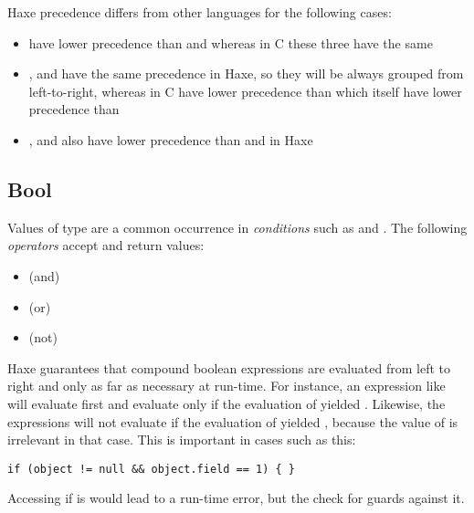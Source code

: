 Haxe precedence differs from other languages for the following cases:
\begin{itemize}
	\item \expr{\%} have lower precedence than \expr{*} and \expr{/} whereas in C these three have the same
	\item \expr{|}, \expr{\&} and \expr{\^} have the same precedence in Haxe, so they will be always grouped from left-to-right, whereas in C \expr{\&} have lower precedence than \expr{\^} which itself have lower precedence than \expr{|}
	\item \expr{|}, \expr{\&} and \expr{\^} also have lower precedence than \expr{==} and \expr{!=} in Haxe
\end{itemize}

\subsection{Bool}
\label{types-bool}


Values of type  are a common occurrence in \emph{conditions} such as  and . The following \emph{operators} accept and return  values:

\begin{itemize}
	\item \expr{\&\&} (and)
	\item \expr{||} (or)
	\item \expr{!} (not)
\end{itemize}

Haxe guarantees that compound boolean expressions are evaluated from left to right and only as far as necessary at run-time. For instance, an expression like  will evaluate  first and evaluate  only if the evaluation of  yielded . Likewise, the expressions  will not evaluate  if the evaluation of  yielded , because the value of  is irrelevant in that case. This is important in cases such as this:

\begin{lstlisting}
if (object != null && object.field == 1) { }
\end{lstlisting}

Accessing  if  is  would lead to a run-time error, but the check for  guards against it.




